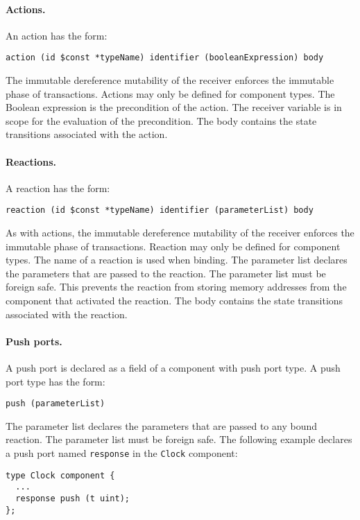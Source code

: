 \paragraph{Actions.}
An action has the form:
\begin{verbatim}
action (id $const *typeName) identifier (booleanExpression) body
\end{verbatim}
The immutable dereference mutability of the receiver enforces the immutable phase of transactions.
Actions may only be defined for component types.
The Boolean expression is the precondition of the action.
The receiver variable is in scope for the evaluation of the precondition.
The body contains the state transitions associated with the action.

\paragraph{Reactions.}
A reaction has the form:
\begin{verbatim}
reaction (id $const *typeName) identifier (parameterList) body
\end{verbatim}
As with actions, the immutable dereference mutability of the receiver enforces the immutable phase of transactions.
Reaction may only be defined for component types.
The name of a reaction is used when binding.
The parameter list declares the parameters that are passed to the reaction.
The parameter list must be foreign safe.
This prevents the reaction from storing memory addresses from the component that activated the reaction.
The body contains the state transitions associated with the reaction.

\paragraph{Push ports.}
A push port is declared as a field of a component with push port type.
A push port type has the form:
\begin{verbatim}
push (parameterList)
\end{verbatim}
The parameter list declares the parameters that are passed to any bound reaction.
The parameter list must be foreign safe.
The following example declares a push port named \verb+response+ in the \verb+Clock+ component:
\begin{verbatim}
type Clock component {
  ...
  response push (t uint);
};
\end{verbatim}

